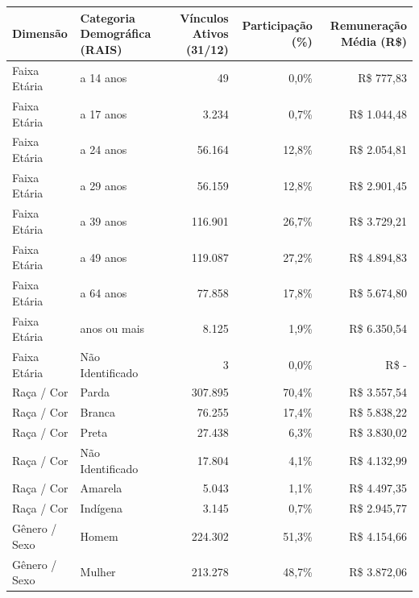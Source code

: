 \documentclass[10pt,a4paper]{article}
\begin{document}
\par\vspace{0.08cm}
\noindent\begin{minipage}{\linewidth}
  \par\vspace{2pt}
  {\fontsize{7.0}{8.6}\selectfont\setlength{\tabcolsep}{4.5pt}%
\begin{tabularx}{\linewidth}{l>{\raggedright\arraybackslash}Xrrr}
\toprule
\rowcolor{corprimaria} \textbf{\color{white}Dimensão} & \textbf{\color{white}Categoria Demográfica (RAIS)} & \textbf{\color{white}Vínculos Ativos (31/12)} & \textbf{\color{white}Participação (\%)} & \textbf{\color{white}Remuneração Média (R\$)} \\
\midrule
Faixa Etária & 10 a 14 anos & 49 & 0,0\% & R\$ 777,83 \\
\rowcolor{corfundo} Faixa Etária & 15 a 17 anos & 3.234 & 0,7\% & R\$ 1.044,48 \\
Faixa Etária & 18 a 24 anos & 56.164 & 12,8\% & R\$ 2.054,81 \\
\rowcolor{corfundo} Faixa Etária & 25 a 29 anos & 56.159 & 12,8\% & R\$ 2.901,45 \\
Faixa Etária & 30 a 39 anos & 116.901 & 26,7\% & R\$ 3.729,21 \\
\rowcolor{corfundo} Faixa Etária & 40 a 49 anos & 119.087 & 27,2\% & R\$ 4.894,83 \\
Faixa Etária & 50 a 64 anos & 77.858 & 17,8\% & R\$ 5.674,80 \\
\rowcolor{corfundo} Faixa Etária & 65 anos ou mais & 8.125 & 1,9\% & R\$ 6.350,54 \\
Faixa Etária & Não Identificado & 3 & 0,0\% & R\$ - \\
\rowcolor{corfundo} Raça / Cor & Parda & 307.895 & 70,4\% & R\$ 3.557,54 \\
Raça / Cor & Branca & 76.255 & 17,4\% & R\$ 5.838,22 \\
\rowcolor{corfundo} Raça / Cor & Preta & 27.438 & 6,3\% & R\$ 3.830,02 \\
Raça / Cor & Não Identificado & 17.804 & 4,1\% & R\$ 4.132,99 \\
\rowcolor{corfundo} Raça / Cor & Amarela & 5.043 & 1,1\% & R\$ 4.497,35 \\
Raça / Cor & Indígena & 3.145 & 0,7\% & R\$ 2.945,77 \\
\rowcolor{corfundo} Gênero / Sexo & Homem & 224.302 & 51,3\% & R\$ 4.154,66 \\
Gênero / Sexo & Mulher & 213.278 & 48,7\% & R\$ 3.872,06 \\
\bottomrule
\end{tabularx}%
}
  \par{}
\end{minipage}
\end{document}
